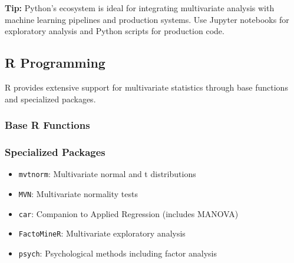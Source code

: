 \documentclass[
]{article}
\begin{document}
\textbf{Tip: } Python's ecosystem is ideal for integrating multivariate
analysis with machine learning pipelines and production systems. Use
Jupyter notebooks for exploratory analysis and Python scripts for
production code.

\textbf{ }

\subsection{R Programming}

R provides extensive support for multivariate statistics through base
functions and specialized packages.

\subsubsection{Base R Functions}

\begin{Shaded}
\begin{Highlighting}[]
\OtherTok{\textless{}{-}} \NormalTok{(}\SpecialCharTok{\textasciitilde{}}

\OtherTok{\textless{}{-}} \NormalTok{(}\SpecialCharTok{\textasciitilde{}}
\NormalTok{)}

\OtherTok{\textless{}{-}} 
\end{Highlighting}
\end{Shaded}

\subsubsection{Specialized Packages}

\begin{itemize}
\item
  \texttt{mvtnorm}: Multivariate normal and t distributions
\item
  \texttt{MVN}: Multivariate normality tests
\item
  \texttt{car}: Companion to Applied Regression (includes MANOVA)
\item
  \texttt{FactoMineR}: Multivariate exploratory analysis
\item
  \texttt{psych}: Psychological methods including factor analysis
\end{itemize}
\end{document}
